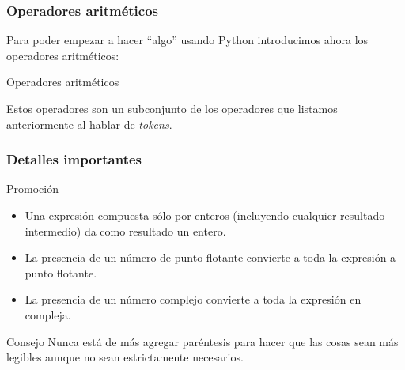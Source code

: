 \documentclass{beamer}
\begin{document}
\begin{frame}[fragile]
\frametitle{Operadores aritméticos}
Para poder empezar a hacer ``algo'' usando Python introducimos ahora los operadores aritméticos:
\begin{block}{Operadores aritméticos}
Estos operadores son un subconjunto de los operadores que listamos anteriormente al hablar de {\em tokens}.
\end{block}
\end{frame}

\begin{frame}[fragile]
\frametitle{Detalles importantes}

\begin{block}{Promoción}
\begin{itemize}
\item Una expresión compuesta sólo por enteros (incluyendo cualquier resultado intermedio) da como resultado un entero. 
\item La presencia de un número de punto flotante convierte a toda la expresión a punto flotante.
\item La presencia de un número complejo convierte a toda la expresión en compleja.
\end{itemize}
\end{block}
\begin{block}{Consejo}
Nunca está de más agregar paréntesis para hacer que las cosas sean más legibles aunque no sean estrictamente necesarios.
\end{block}
\end{frame}
\end{document}
